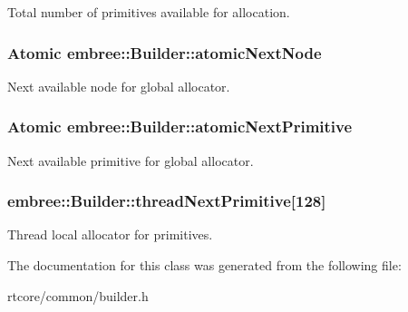 Total number of primitives available for allocation. 

\hypertarget{classembree_1_1_builder_a5de33d69fa2c9fb5057672a268e4485e}{
\subsubsection[{atomicNextNode}]{\setlength{\rightskip}{0pt plus 5cm}Atomic {\bf embree::Builder::atomicNextNode}}}
\label{classembree_1_1_builder_a5de33d69fa2c9fb5057672a268e4485e}


Next available node for global allocator. 

\hypertarget{classembree_1_1_builder_a1f1348c5b8ba03a6396570823e44fc4c}{
\subsubsection[{atomicNextPrimitive}]{\setlength{\rightskip}{0pt plus 5cm}Atomic {\bf embree::Builder::atomicNextPrimitive}}}
\label{classembree_1_1_builder_a1f1348c5b8ba03a6396570823e44fc4c}


Next available primitive for global allocator. 

\hypertarget{classembree_1_1_builder_a83eb9ae6190fbd6e3dcb304aea6cbfd2}{
\subsubsection[{threadNextPrimitive}]{ {\bf embree::Builder::threadNextPrimitive}\mbox{[}128\mbox{]}}}
\label{classembree_1_1_builder_a83eb9ae6190fbd6e3dcb304aea6cbfd2}


Thread local allocator for primitives. 



The documentation for this class was generated from the following file:\begin{DoxyCompactItemize}
\item 
rtcore/common/builder.h\end{DoxyCompactItemize}
